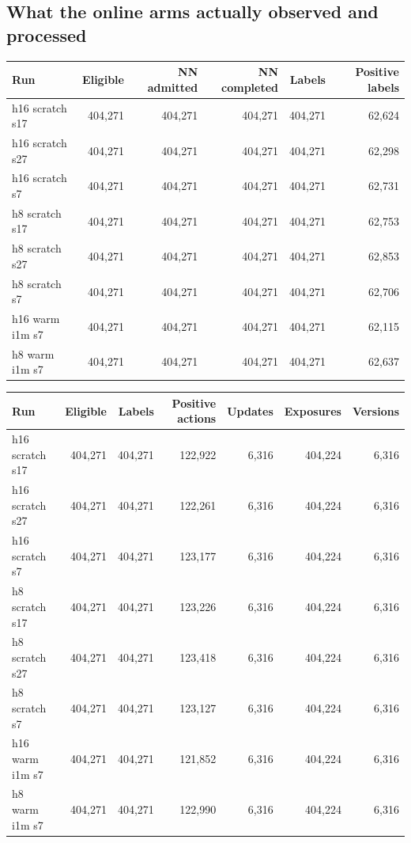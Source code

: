 \documentclass[10pt]{article}
\begin{document}
\subsection{What the online arms actually observed and processed}

\begin{center}
\scriptsize
\begin{longtable}{lrrrrr}
\toprule
Run & Eligible & NN admitted & NN completed & Labels & Positive labels \\
\midrule
\endhead
h16 scratch s17 & 404,271 & 404,271 & 404,271 & 404,271 & 62,624 \\
h16 scratch s27 & 404,271 & 404,271 & 404,271 & 404,271 & 62,298 \\
h16 scratch s7 & 404,271 & 404,271 & 404,271 & 404,271 & 62,731 \\
h8 scratch s17 & 404,271 & 404,271 & 404,271 & 404,271 & 62,753 \\
h8 scratch s27 & 404,271 & 404,271 & 404,271 & 404,271 & 62,853 \\
h8 scratch s7 & 404,271 & 404,271 & 404,271 & 404,271 & 62,706 \\
h16 warm i1m s7 & 404,271 & 404,271 & 404,271 & 404,271 & 62,115 \\
h8 warm i1m s7 & 404,271 & 404,271 & 404,271 & 404,271 & 62,637 \\
\bottomrule
\end{longtable}
\end{center}

\begin{center}
\scriptsize
\begin{longtable}{lrrrrrr}
\toprule
Run & Eligible & Labels & Positive actions & Updates & Exposures & Versions \\
\midrule
\endhead
h16 scratch s17 & 404,271 & 404,271 & 122,922 & 6,316 & 404,224 & 6,316 \\
h16 scratch s27 & 404,271 & 404,271 & 122,261 & 6,316 & 404,224 & 6,316 \\
h16 scratch s7 & 404,271 & 404,271 & 123,177 & 6,316 & 404,224 & 6,316 \\
h8 scratch s17 & 404,271 & 404,271 & 123,226 & 6,316 & 404,224 & 6,316 \\
h8 scratch s27 & 404,271 & 404,271 & 123,418 & 6,316 & 404,224 & 6,316 \\
h8 scratch s7 & 404,271 & 404,271 & 123,127 & 6,316 & 404,224 & 6,316 \\
h16 warm i1m s7 & 404,271 & 404,271 & 121,852 & 6,316 & 404,224 & 6,316 \\
h8 warm i1m s7 & 404,271 & 404,271 & 122,990 & 6,316 & 404,224 & 6,316 \\
\bottomrule
\end{longtable}
\end{center}
\end{document}
